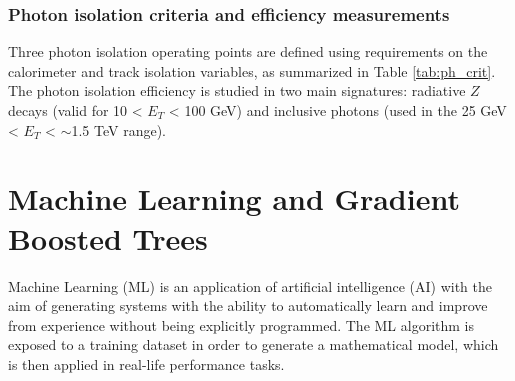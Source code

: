 \documentclass[a4paper, oneside, 11pt, openright]{book}
\begin{document}
		\subsection{Photon isolation criteria and efficiency measurements}
			Three photon isolation operating points are defined using requirements on the calorimeter and track isolation variables, as summarized in Table \ref{tab:ph_crit}. The photon isolation efficiency is studied in two main signatures: radiative $Z$ decays (valid for 10 < $E_T$ < 100 GeV) and inclusive photons (used in the 25 GeV < $E_T$ < $\sim$1.5 TeV range).
			
		
			\begin{center}
				\small
				\begin{table}[htbp]
					\caption{Definition of the photon isolation working points.}
					\label{tab:ph_crit} 
				\end{table}
			\end{center}
		
		
		
	\chapter{Machine Learning and Gradient Boosted Trees} \label{cap:Cap}
		Machine Learning (ML) is an application of artificial intelligence (AI) \cite{Lifelong ML} with the aim of generating systems with the ability to automatically learn and improve from experience without being explicitly programmed. The ML algorithm is exposed to a training dataset in order to generate a mathematical model, which is then applied in real-life performance tasks. %
		
\end{document}
